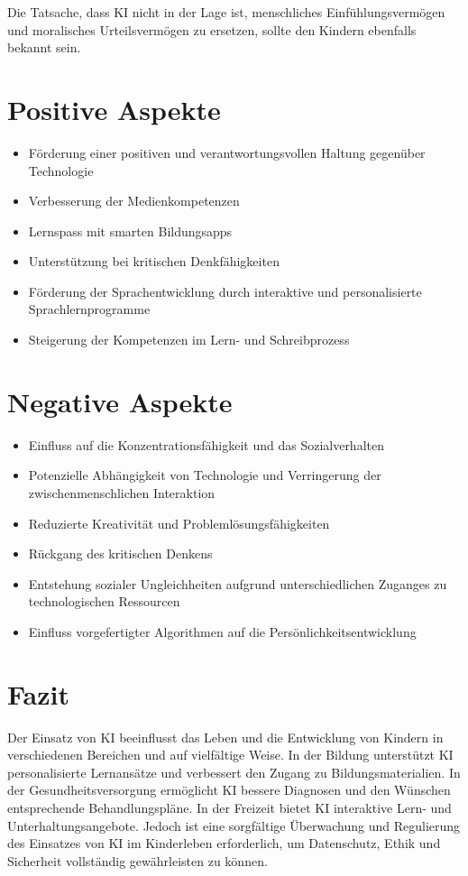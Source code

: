 \documentclass{report}
\begin{document}
Die Tatsache, dass KI nicht in der Lage ist, menschliches Einfühlungsvermögen und moralisches Urteilsvermögen zu ersetzen, sollte den Kindern ebenfalls bekannt sein. 

\section{Positive Aspekte}

\begin{itemize}

    \item Förderung einer positiven und verantwortungsvollen Haltung gegenüber Technologie
    \item Verbesserung der Medienkompetenzen
    \item Lernspass mit smarten Bildungsapps
    \item Unterstützung bei kritischen Denkfähigkeiten
    \item Förderung der Sprachentwicklung durch interaktive und personalisierte Sprachlernprogramme
    \item Steigerung der Kompetenzen im Lern- und Schreibprozess

\end{itemize}

\section{Negative Aspekte}

\begin{itemize}

    \item Einfluss auf die Konzentrationsfähigkeit und das Sozialverhalten
    \item Potenzielle Abhängigkeit von Technologie und Verringerung der zwischenmenschlichen Interaktion
    \item Reduzierte Kreativität und Problemlösungsfähigkeiten
    \item Rückgang des kritischen Denkens
    \item Entstehung sozialer Ungleichheiten aufgrund unterschiedlichen Zuganges zu technologischen Ressourcen
    \item Einfluss vorgefertigter Algorithmen auf die Persönlichkeitsentwicklung

\end{itemize}

\section{Fazit}

Der Einsatz von KI beeinflusst das Leben und die Entwicklung von Kindern in verschiedenen Bereichen und auf vielfältige Weise. In der Bildung unterstützt KI personalisierte Lernansätze und verbessert den Zugang zu Bildungsmaterialien. In der Gesundheitsversorgung ermöglicht KI bessere Diagnosen und den Wünschen entsprechende Behandlungspläne. In der Freizeit bietet KI interaktive Lern- und Unterhaltungsangebote. 
Jedoch ist eine sorgfältige Überwachung und Regulierung des Einsatzes von KI im Kinderleben erforderlich, um Datenschutz, Ethik und Sicherheit vollständig gewährleisten zu können. 

\nocite{*}
\printbibliography
\end{document}
